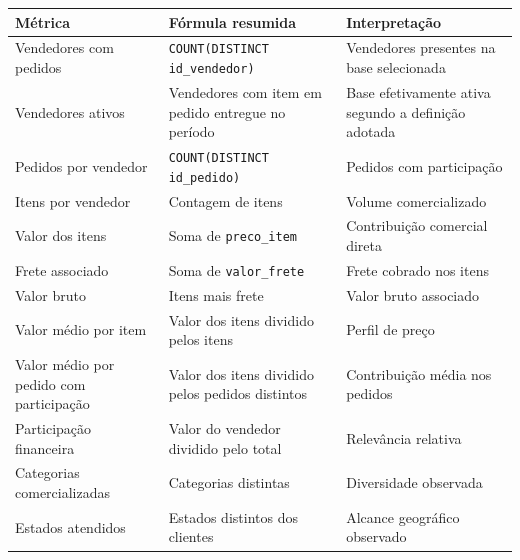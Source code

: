 \documentclass[12pt,a4paper]{article}
\newcounter{none}
\begin{document}
{\def\LTcaptype{none} %
\begin{longtable}[]{@{}
  >{\raggedright\arraybackslash}p{}
  >{\raggedright\arraybackslash}p{}
  >{\raggedright\arraybackslash}p{}@{}}
\toprule\noalign{}
\rowcolor{AzulCorporativo}
\begin{minipage}[b]{\linewidth}\raggedright\color{white}\bfseries
Métrica
\end{minipage} & \begin{minipage}[b]{\linewidth}\raggedright\color{white}\bfseries
Fórmula resumida
\end{minipage} & \begin{minipage}[b]{\linewidth}\raggedright\color{white}\bfseries
Interpretação
\end{minipage} \\
\midrule\noalign{}
\endhead
\bottomrule\noalign{}
\endlastfoot
Vendedores com pedidos & \nolinkurl{COUNT(DISTINCT id_vendedor)} &
Vendedores presentes na base selecionada \\
Vendedores ativos & Vendedores com item em pedido entregue no período &
Base efetivamente ativa segundo a definição adotada \\
Pedidos por vendedor & \nolinkurl{COUNT(DISTINCT id_pedido)} & Pedidos
com participação \\
Itens por vendedor & Contagem de itens & Volume comercializado \\
Valor dos itens & Soma de \nolinkurl{preco_item} & Contribuição
comercial direta \\
Frete associado & Soma de \nolinkurl{valor_frete} & Frete cobrado nos
itens \\
Valor bruto & Itens mais frete & Valor bruto associado \\
Valor médio por item & Valor dos itens dividido pelos itens & Perfil de
preço \\
Valor médio por pedido com participação & Valor dos itens dividido pelos
pedidos distintos & Contribuição média nos pedidos \\
Participação financeira & Valor do vendedor dividido pelo total &
Relevância relativa \\
Categorias comercializadas & Categorias distintas & Diversidade
observada \\
Estados atendidos & Estados distintos dos clientes & Alcance geográfico
observado \\
\end{longtable}
}
\end{document}

